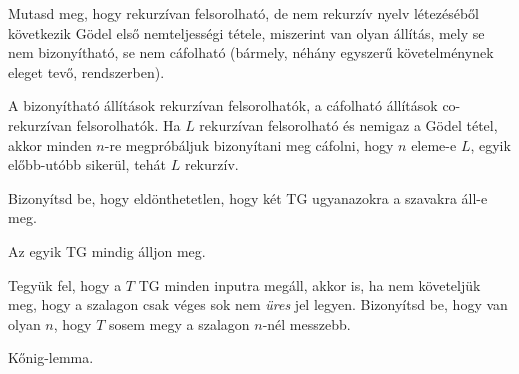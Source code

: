 \begin{Exercise}[counter={sorszam}, difficulty=0]
	Mutasd meg, hogy rekurz\'ivan felsorolhat\'o, de nem rekurz\'iv nyelv l\'etez\'es\'eb\H ol k\"ovetkezik G\"odel els\H o nemteljess\'egi t\'etele, miszerint van olyan \'all\'it\'as, mely se nem bizony\'ithat\'o, se nem c\'afolhat\'o (b\'armely, n\'eh\'any egyszer\H u k\"ovetelm\'enynek eleget tev\H o, rendszerben).
\end{Exercise}	
\begin{Answer}
	A bizony\'ithat\'o \'all\'it\'asok rekurz\'ivan felsorolhat\'ok, a c\'afolhat\'o \'all\'it\'asok co-rekurz\'ivan felsorolhat\'ok. Ha $L$ rekurz\'ivan felsorolhat\'o \'es nemigaz a G\"odel t\'etel, akkor minden $n$-re megpr\'ob\'aljuk bizony\'itani meg c\'afolni, hogy $n$ eleme-e $L$, egyik el\H obb-ut\'obb siker\"ul, teh\'at $L$ rekurz\'iv.
\end{Answer}


\begin{Exercise}[counter={sorszam}, difficulty=0]
	Bizonyítsd be, hogy eldönthetetlen, hogy két TG ugyanazokra a szavakra áll-e meg.
\end{Exercise}	
\begin{Answer}
	Az egyik TG mindig \'alljon meg.
\end{Answer}

\begin{Exercise}[counter={sorszam}, difficulty=0]
	Tegyük fel, hogy a $T$ TG minden inputra megáll, akkor is, ha nem követeljük meg, hogy a szalagon csak véges sok nem {\em üres} jel legyen. Bizonyítsd be, hogy van olyan $n$, hogy $T$ sosem megy a szalagon $n$-nél messzebb.
\end{Exercise}	
\begin{Answer}
	K\H onig-lemma.
\end{Answer}

